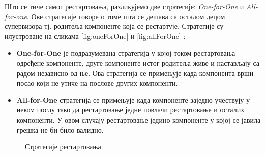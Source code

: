 \documentclass[12pt,oneside]{memoir}
\begin{document}
Што се тиче самог рестартовања, разликујемо две стратегије: \textit{One-for-One} и \textit{All-for-one}. Ове стратегије говоре о томе шта се дешава са осталом децом супервизора тј. родитеља компоненте која се рестартује. Стратегије су илустроване на сликама \ref{fig:oneForOne} и \ref{fig:allForOne} \cite{progInScala3, akkaDoc}:
\begin{itemize}
\item \textbf{One-for-One} је подразумевана стратегија у којој током рестартовања одређене компоненте, друге компоненте истог родитеља живе и настављају са радом независно од ње. Ова стратегија се примењује када компонента врши посао који не утиче на послове других компоненти.
\item \textbf{All-for-One} стратегија се примењује када компоненте заједно учествују у неком послу тако да рестартовање једне повлачи рестартовање и осталих компоненти. У овом случају рестартовање једино компоненте у којој се јавила грешка не би било валидно.
\end{itemize}

\begin{figure}[!tbp]
  \centering
  \hfill
  \caption{Стратегије рестартовања}
\end{figure}



\end{document}
